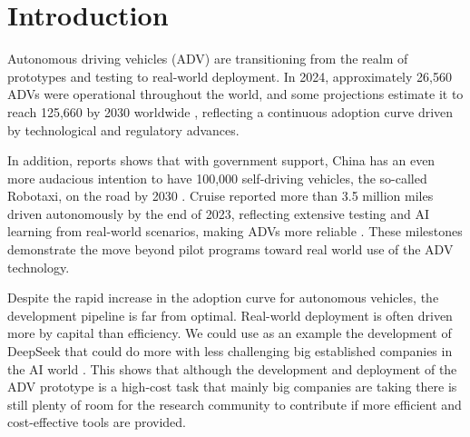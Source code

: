\chapter{Introduction} \label{intro} 
\vspace{-1.9cm}



 Autonomous driving vehicles (ADV) are transitioning from the realm of prototypes and testing to real-world deployment. In 2024, approximately 26,560 ADVs were operational throughout the world, and some projections estimate it to reach 125,660 by 2030 worldwide \cite{gds2024}, reflecting a continuous adoption curve driven by technological and regulatory advances. 
 
 In addition, reports shows that with government support, China has an even more audacious intention to have 100,000 self-driving vehicles, the so-called Robotaxi, on the road by 2030 \cite{patentpc2025}. Cruise reported more than 3.5 million miles driven autonomously by the end of 2023, reflecting extensive testing and AI learning from real-world scenarios, making ADVs more reliable \cite{patentpc2025}. These milestones demonstrate the move beyond pilot programs toward real world use of the ADV technology.
 

Despite the rapid increase in the adoption curve for autonomous vehicles, the development pipeline is far from optimal. Real-world deployment is often driven more by capital than efficiency. We could use as an example the development of DeepSeek that could do more with less challenging big established companies in the AI world \cite{authorsourceability2025}. This shows that although the development and deployment of the ADV prototype is a high-cost task that mainly big companies are taking \cite{silva2024} there is still plenty of room for the research community to contribute if more efficient and cost-effective tools are provided. %
 
